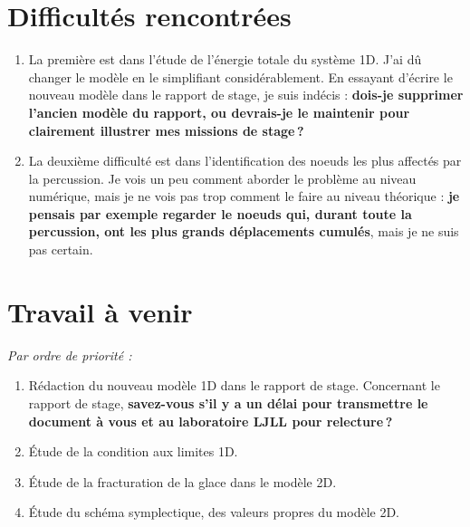 \documentclass[
  french,
	11pt, %
]{fphw}
\begin{document}
 

\section*{Difficultés rencontrées}


\begin{enumerate}
  \item La première est dans l'étude de l'énergie totale du système 1D. J'ai dû changer le modèle en le simplifiant considérablement. En essayant d'écrire le nouveau modèle dans le rapport de stage, je suis indécis : \textbf{dois-je supprimer l'ancien modèle du rapport, ou devrais-je le maintenir pour clairement illustrer mes missions de stage ?} 
  \item La deuxième difficulté est dans l'identification des noeuds les plus affectés par la percussion. Je vois un peu comment aborder le problème au niveau numérique, mais je ne vois pas trop comment le faire au niveau théorique : \textbf{je pensais par exemple regarder le noeuds qui, durant toute la percussion, ont les plus grands déplacements cumulés}, mais je ne suis pas certain.
\end{enumerate}



\section*{Travail à venir}

\emph{Par ordre de priorité :}

\begin{enumerate}
  \item Rédaction du nouveau modèle 1D dans le rapport de stage. Concernant le rapport de stage, \textbf{savez-vous s'il y a un délai pour transmettre le document à vous et au laboratoire LJLL pour relecture ?} 
  \item Étude de la condition aux limites 1D.
  \item Étude de la fracturation de la glace dans le modèle 2D.
  \item Étude du schéma symplectique, des valeurs propres du modèle 2D.
\end{enumerate}


 
\clearpage   %
\end{document}
